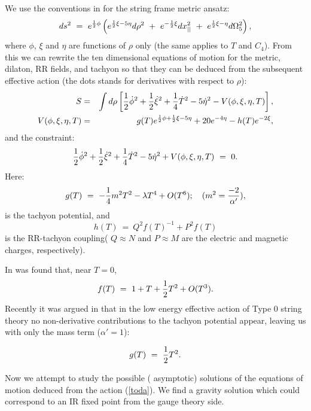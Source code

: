 \documentclass[a4paper,12pt]{article}
\def\half{{1 \over 2}}
\begin{document}
We use the conventions in \cite{kt} for the string frame metric ansatz: 
\begin{equation}
ds^2~=~e^{\half\phi}\left(e^{\half\xi-5\eta}d\rho^2~+~e^{-\half\xi}dx_{||}^2
~+~e^{\half\xi-\eta}d\Omega_5^2\right),
\label{met}
\end{equation}
where $\phi$, $\xi$ and $\eta$ are functions of $\rho$ only 
(the same applies to  $T$ and $C_4$). From this
 we can rewrite the ten dimensional equations of motion
for the metric, dilaton, RR fields, and tachyon so that they can be deduced
from the subsequent effective action (the dots stands for derivatives with respect to $\rho$):
\begin{eqnarray}
S&=&\int d\rho\left[\half \dot\phi^2+\half\dot\xi^2+{1\over4}\dot T^2
-5\dot\eta^2- V(\phi,\xi,\eta,T)\right],\\
V(\phi,\xi,\eta,T)&=&g(T)e^{\half\phi+\half\xi-5\eta}+20e^{-4\eta}-
h(T)e^{-2\xi},
\label{toda}
\end{eqnarray}
\noindent and the constraint:
\begin{equation}
\half \dot\phi^2+\half\dot\xi^2+{1\over4}\dot T^2-5\dot\eta^2+
V(\phi,\xi,\eta,T)~=~0.
\label{constr}
\end{equation}
\noindent Here:
\begin{equation}
g(T)~=~ -{1\over4}{m^2}T^2-{\lambda}T^4+O(T^6);\quad   ({m^2= {-2\over{\alpha'}})}, 
\end{equation}
\noindent is the tachyon potential, and
\begin{equation} 
h(T)~=~Q^2{f(T)}^{-1}+P^2f(T) 
\end{equation} 
\noindent is the RR-tachyon coupling( $Q\approx N$ and $P\approx M$ are the electric and magnetic charges, respectively).

In \cite{kt} was found that, near $T=0$, 
\begin{equation} 
f(T)~=~1+T+\half T^2+O(T^3). 
\label{effe}
\end{equation} 
\noindent Recently it was argued in \cite{t} that in the low energy effective 
action of Type 0 string theory no non-derivative contributions to the tachyon potential appear, leaving us with only the mass term ($\alpha'=1$): 

\begin{equation} 
g(T)~=~ \half T^2. 
\end{equation} 

\noindent Now we attempt to study the possible ( asymptotic) solutions of the equations of motion deduced from the action (\ref{toda}). We find a gravity solution which could correspond to
 an IR fixed point from the gauge theory side.
\end{document}
